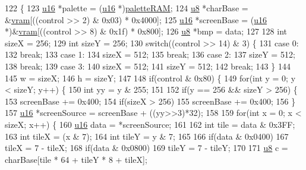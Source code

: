 \begin{DoxyCode}
122 \{
123   \mbox{\hyperlink{_system_8h_a9e6c91d77e24643b888dbd1a1a590054}{u16}} *palette = (\mbox{\hyperlink{_system_8h_a9e6c91d77e24643b888dbd1a1a590054}{u16}} *)\mbox{\hyperlink{_globals_8cpp_aea0283719ad27328f3cf5f883f58813e}{paletteRAM}};
124   \mbox{\hyperlink{_system_8h_aed742c436da53c1080638ce6ef7d13de}{u8}} *charBase = &\mbox{\hyperlink{_globals_8cpp_a983f8cd19ae66ea98e180c2e13bee5b9}{vram}}[((control >> 2) & 0x03) * 0x4000];
125   \mbox{\hyperlink{_system_8h_a9e6c91d77e24643b888dbd1a1a590054}{u16}} *screenBase = (\mbox{\hyperlink{_system_8h_a9e6c91d77e24643b888dbd1a1a590054}{u16}} *)&\mbox{\hyperlink{_globals_8cpp_a983f8cd19ae66ea98e180c2e13bee5b9}{vram}}[((control >> 8) & 0x1f) * 0x800];
126   \mbox{\hyperlink{_system_8h_aed742c436da53c1080638ce6ef7d13de}{u8}} *bmp = data;
127 
128   \textcolor{keywordtype}{int} sizeX = 256;
129   \textcolor{keywordtype}{int} sizeY = 256;
130   \textcolor{keywordflow}{switch}((control >> 14) & 3) \{
131   \textcolor{keywordflow}{case} 0:
132     \textcolor{keywordflow}{break};
133   \textcolor{keywordflow}{case} 1:
134     sizeX = 512;
135     \textcolor{keywordflow}{break};
136   \textcolor{keywordflow}{case} 2:
137     sizeY = 512;
138     \textcolor{keywordflow}{break};
139   \textcolor{keywordflow}{case} 3:
140     sizeX = 512;
141     sizeY = 512;
142     \textcolor{keywordflow}{break};
143   \}
144 
145   w = sizeX;
146   h = sizeY;
147   
148   \textcolor{keywordflow}{if}(control & 0x80) \{
149     \textcolor{keywordflow}{for}(\textcolor{keywordtype}{int} y = 0; y < sizeY; y++) \{
150       \textcolor{keywordtype}{int} yy = y & 255;
151 
152       \textcolor{keywordflow}{if}(y == 256 && sizeY > 256) \{
153         screenBase += 0x400;
154         \textcolor{keywordflow}{if}(sizeX > 256)
155           screenBase += 0x400;
156       \}
157       \mbox{\hyperlink{_system_8h_a9e6c91d77e24643b888dbd1a1a590054}{u16}} *screenSource = screenBase + ((yy>>3)*32);
158 
159       \textcolor{keywordflow}{for}(\textcolor{keywordtype}{int} x = 0; x < sizeX; x++) \{
160         \mbox{\hyperlink{_system_8h_a9e6c91d77e24643b888dbd1a1a590054}{u16}} data = *screenSource;
161       
162         \textcolor{keywordtype}{int} tile = data & 0x3FF;
163         \textcolor{keywordtype}{int} tileX = (x & 7);
164         \textcolor{keywordtype}{int} tileY = y & 7;
165         
166         \textcolor{keywordflow}{if}(data & 0x0400)
167           tileX = 7 - tileX;
168         \textcolor{keywordflow}{if}(data & 0x0800)
169           tileY = 7 - tileY;
170 
171         \mbox{\hyperlink{_system_8h_aed742c436da53c1080638ce6ef7d13de}{u8}} c = charBase[tile * 64 + tileY * 8 + tileX];

\end{DoxyCode}
